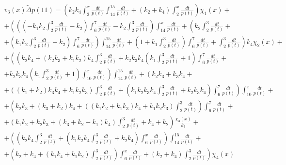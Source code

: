 \documentclass[a4paper,12pt]{article} %
\begin{document}
\begin{multline}
	{v_3(x)}{\tilde{\Delta}}p(11)=
	\left(
		k_2 k_4 \int_{2}^{x}\frac{dt}{p(t)} \int_{14}^{15}\frac{dt}{p(t)}+\left( k_2+k_4\right)  \int_{2}^{x}\frac{dt}{p(t)}
	\right)\chi_1(x)
	+\\+
	\left(
		\left( \left( -k_1 k_2 \int_{2}^{3}\frac{dt}{p(t)}-k_2\right)  \int_{6}^{7}\frac{dt}{p(t)}-k_2 \int_{2}^{3}\frac{dt}{p(t)}\right)  \int_{14}^{x}\frac{dt}{p(t)}+\left( k_2 \int_{2}^{3}\frac{dt}{p(t)}
		\right.\right. +\\+ \left.\left.
		\left( k_1 k_2 \int_{2}^{3}\frac{dt}{p(t)}+k_2\right)  \int_{6}^{7}\frac{dt}{p(t)}\right)  \int_{14}^{15}\frac{dt}{p(t)}+\left( 1+k_1 \int_{2}^{3}\frac{dt}{p(t)}\right)  \int_{6}^{7}\frac{dt}{p(t)}+\int_{2}^{3}\frac{dt}{p(t)}
	\right)k_4\chi_2(x)
	+\\+
	\left(
		\left(
			k_2 k_4+\left( k_2 k_3+k_1 k_2\right)  k_4 \int_{2}^{3}\frac{dt}{p(t)}+
			k_2 k_3 k_4 \left( k_1 \int_{2}^{3}\frac{dt}{p(t)}+1\right) \int_{ 6}^{7}\frac{dt}{p(t)}
			\right.\right. +\\+ \left.\left.
			k_2 k_3 k_4 \left( k_1 \int_{2}^{3}\frac{dt}{p(t)}+1\right) \int_{10}^{x}\frac{dt}{p(t)}
		\right)
		\int_{14}^{15}\frac{dt}{p(t)}+\left( k_2 k_3+k_3 k_4
		\right.\right. +\\+ \left.\left.
		\left( \left( k_1+k_2\right)  k_3 k_4+k_1 k_2 k_3\right)  \int_{2}^{3}\frac{dt}{p(t)}+\left( k_1 k_2 k_3 k_4 \int_{2}^{3}\frac{dt}{p(t)}+k_2 k_3 k_4\right)  \int_{6}^{7}\frac{dt}{p(t)}\right)  \int_{10}^{x}\frac{dt}{p(t)}
		\right. +\\+ \left.
		\left( k_2 k_3+\left( k_3+k_2\right)  k_4+\left( \left( k_1 k_2+k_1 k_3\right)  k_4+k_1 k_2 k_3\right)  \int_{2}^{3}\frac{dt}{p(t)}\right)  \int_{6}^{7}\frac{dt}{p(t)}
		\right. +\\+ \left.
		\left( k_1 k_2+k_2 k_3+\left( k_3+k_2+k_1\right)  k_4\right)  \int_{2}^{3}\frac{dt}{p(t)}+k_4+k_2
	\right)\frac{\chi_3(x)}{k_3}
	+\\+
	\left(
		\left( k_2 k_4 \int_{2}^{3}\frac{dt}{p(t)}+\left( k_1 k_2 k_4 \int_{2}^{3}\frac{dt}{p(t)}+k_2 k_4\right)  \int_{6}^{x}\frac{dt}{p(t)}\right)  \int_{14}^{15}\frac{dt}{p(t)}
		\right. +\\+ \left.
		\left( k_2+k_4+\left( k_1 k_4+k_1 k_2\right)  \int_{2}^{3}\frac{dt}{p(t)}\right)  \int_{6}^{x}\frac{dt}{p(t)}+\left( k_2+k_4\right)  \int_{2}^{3}\frac{dt}{p(t)}
	\right)\chi_4(x)
\end{multline}
\end{document}

